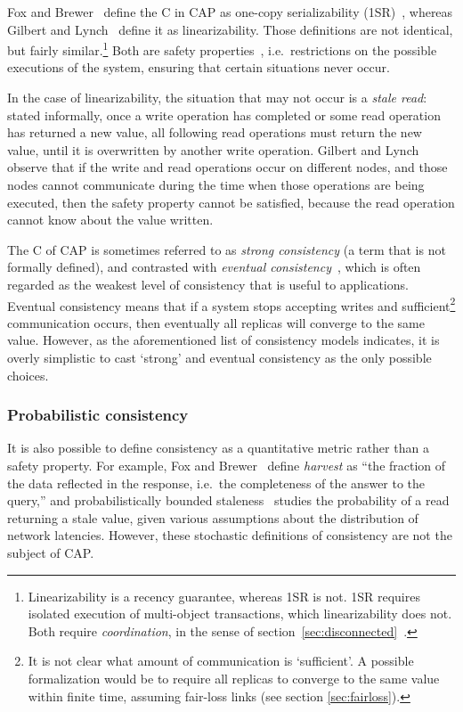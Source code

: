 \documentclass[a4paper,twocolumn,10pt]{article}
\begin{document}
Fox and Brewer~\cite{Fox1999bs} define the C in CAP as one-copy serializability
(1SR)~\cite{Bernstein1987va}, whereas Gilbert and Lynch~\cite{Gilbert2002il} define it as
linearizability. Those definitions are not identical, but fairly similar.\footnote{Linearizability
is a recency guarantee, whereas 1SR is not. 1SR requires isolated execution of multi-object
transactions, which linearizability does not. Both require \emph{coordination}, in the sense of
section~\ref{sec:disconnected}~\cite{Bailis2014vc}.} Both are safety properties~\cite{Alpern1985dg},
i.e.\ restrictions on the possible executions of the system, ensuring that certain situations never
occur.

In the case of linearizability, the situation that may not occur is a \emph{stale read}: stated
informally, once a write operation has completed or some read operation has returned a new value,
all following read operations must return the new value, until it is overwritten by another write
operation. Gilbert and Lynch observe that if the write and read operations occur on different nodes,
and those nodes cannot communicate during the time when those operations are being executed, then
the safety property cannot be satisfied, because the read operation cannot know about the value
written.

The C of CAP is sometimes referred to as \emph{strong consistency} (a term that is not formally
defined), and contrasted with \emph{eventual consistency}~\cite{Terry1994fp, Vogels2008ey, Bailis2013jc},
which is often regarded as the weakest level of consistency that is useful to applications. Eventual
consistency means that if a system stops accepting writes and sufficient\footnote{It is not clear
what amount of communication is `sufficient'. A possible formalization would be to require all
replicas to converge to the same value within finite time, assuming fair-loss links (see section
\ref{sec:fairloss}).} communication occurs, then eventually all replicas will converge to the same
value. However, as the aforementioned list of consistency models indicates, it is overly simplistic
to cast `strong' and eventual consistency as the only possible choices.

\subsubsection{Probabilistic consistency}

It is also possible to define consistency as a quantitative metric rather than a safety property.
For example, Fox and Brewer~\cite{Fox1999bs} define \emph{harvest} as ``the fraction of the data
reflected in the response, i.e.\ the completeness of the answer to the query,'' and
probabilistically bounded staleness~\cite{Bailis2012to} studies the probability of a read returning
a stale value, given various assumptions about the distribution of network latencies. However, these
stochastic definitions of consistency are not the subject of CAP.
\end{document}
